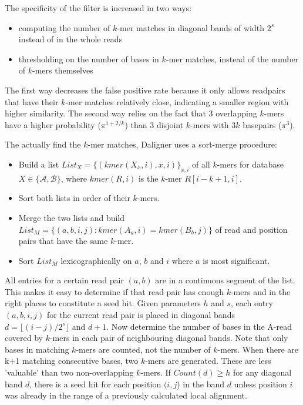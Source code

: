 \documentclass[../main/thesis.tex]{subfiles}
\begin{document}
The specificity of the filter is increased in two ways:
\begin{itemize}
\item computing the number of $k$-mer matches in diagonal bands of width $2^s$ instead of in the whole reads
\item thresholding on the number of bases in $k$-mer matches, instead of the number of $k$-mers themselves
\end{itemize}

The first way decreases the false positive rate because it only allows readpairs that have their $k$-mer matches relatively close, indicating a smaller region with higher similarity.
The second way relies on the fact that 3 overlapping $k$-mers have a higher probability ($\pi^{1+2/k}$) than 3 disjoint $k$-mers with $3k$ basepairs ($\pi^3$).


The actually find the $k$-mer matches, Daligner uses a sort-merge procedure:
\begin{itemize}
\item Build a list $List_X = \{(kmer(X_x,i),x,i)\}_{x,i}$ of all $k$-mers for database $X \in \{\mathcal{A},\mathcal{B}\}$, where $kmer(R,i)$ is the $k$-mer $R[i-k+1,i]$.
\item Sort both lists in order of their $k$-mers.
\item Merge the two lists and build $List_M=\{(a,b,i,j): kmer(A_a,i) = kmer(B_b,j)\}$ of read and position pairs that have the same $k$-mer.
\item Sort $List_M$ lexicographically on $a$, $b$ and $i$ where $a$ is most significant.
\end{itemize}

All entries for a certain read pair $(a,b)$ are in a continuous segment of the list.
This makes it easy to determine if that read pair has enough $k$-mers and in the right places to constitute a seed hit.
Given parameters $h$ and $s$, each entry $(a,b,i,j)$ for the current read pair is placed in diagonal bands $d = \lfloor(i-j)/2^s\rfloor$ and $d+1$.
Now determine the number of bases in the A-read covered by $k$-mers in each pair of neighbouring diagonal bands.
Note that only bases in matching $k$-mers are counted, not the number of $k$-mers.
When there are k+1 matching consecutive bases, two $k$-mers are generated.
These are less 'valuable' than two non-overlapping $k$-mers.
If $Count(d) \ge h$ for any diagonal band $d$, there is a seed hit for each position $(i,j$) in the band $d$ unless position $i$ was already in the range of a previously calculated local alignment.
\end{document}
